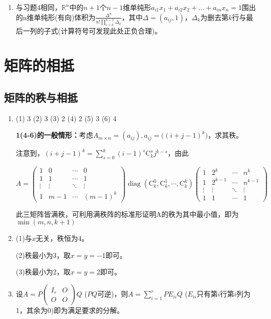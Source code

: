 \documentclass[a4paper,UTF8,fontset=windows]{ctexart}
\DeclareMathOperator{\diag}{diag}
\begin{document}
\begin{enumerate}
\item
与习题4相同，$\mathbb{R}^n$中的$n+1$个$n-1$维单纯形$a_{i1}x_1+a_{i2}x_2+\dots+a_{in}x_n=1$围出的n维单纯形(有向)体积为$\frac{\Delta^n}{n!\prod_{i=k}^{n+1}\Delta_k}$，其中$\Delta=(a_{ij},1)$，$\Delta_k$为删去第$k$行与最后一列的子式(计算符号可发现此处正负合理)。
\end{enumerate}

\section{矩阵的相抵}
\subsection{矩阵的秩与相抵}
\begin{enumerate}
\item
(1) 3 (2) 3 (3) 2 (4) 2 (5) 3 (6) 4

\textbf{1(4-6)的一般情形：}考虑$A_{m\times n}=(a_{ij}),a_{ij}=\big((i+j-1)^k\big)$，求其秩。

注意到，$(i+j-1)^k=\sum_{s=0}^{k}(i-1)^s\mathrm{C}_k^sj^{k-s}$，由此

$A=\begin{pmatrix}1&0&\cdots&0\\1&1&\cdots&1\\\vdots&\vdots&\ddots&\vdots\\1&m-1&\cdots&(m-1)^k\end{pmatrix}\diag(\mathrm{C}_k^0,\mathrm{C}_k^1,\cdots,\mathrm{C}_k^k)\begin{pmatrix}1&2^k&\cdots&n^k\\1&2^{k-1}&\cdots&n^{k-1}\\\vdots&\vdots&\ddots&\vdots\\1&1&\cdots&1\end{pmatrix}$

此三矩阵皆满秩，可利用满秩阵的标准形证明A的秩为其中最小值，即为$\min(m,n,k+1)$

\item
(1)与$x$无关，秩恒为4。

(2)秩最小为3，取$x=y=-1$即可。

(3)秩最小为2，取$x=y=2$即可。

\item
设$A=P\begin{pmatrix}I_r&O\\O&O\end{pmatrix}Q$ ($PQ$可逆)，则$A=\sum_{i=1}^{r}{PE_{ii}Q}$ ($E_{ii}$只有第$i$行第$i$列为1，其余为0)即为满足要求的分解。


\end{enumerate}
\end{document}
